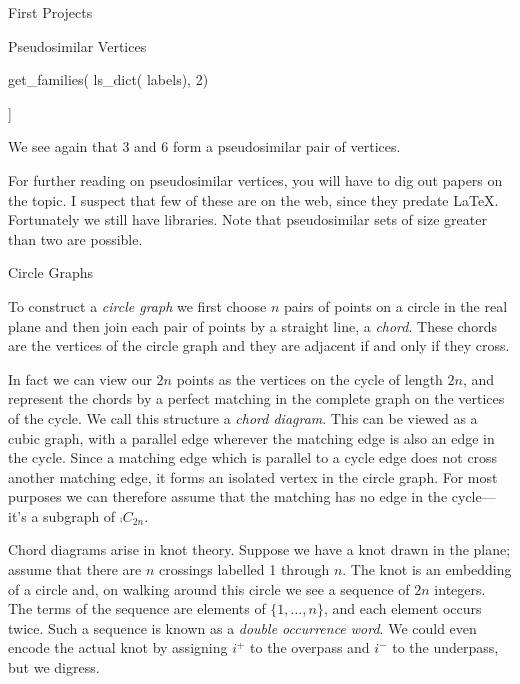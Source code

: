 \begin{chap}{First Projects}
\begin{sect}{Pseudosimilar Vertices}
\begin{sagecode}
\begin{sageinput}
get_families( ls_dict( labels), 2)
\end{sageinput}
\begin{sageoutput}
[[3, 6]]
\end{sageoutput}
\end{sagecode}
%
\begin{para}
We see again that 3 and 6 form a pseudosimilar pair of vertices.
\end{para}
%
\begin{para}
For further reading on pseudosimilar vertices, you will have to dig out papers
on the topic.  I suspect that few of these are on the web, since they
predate \LaTeX{}.  Fortunately we still have libraries.  Note that pseudosimilar
sets of size greater than two are possible.
\end{para}
%
\end{sect}
%
\begin{sect}{Circle Graphs}
%
\begin{para}
To construct a \textsl{circle graph} we first choose $n$ pairs of points on a 
circle in the real plane and then join each pair of points by a straight line,
a \textsl{chord}. These chords are the vertices of the circle graph and they
are adjacent if and only if they cross.
\end{para}
%
\begin{para}
In fact we can view our $2n$ points as the vertices on the cycle of length
$2n$, and represent the chords by a perfect matching in the complete graph
on the vertices of the cycle. We call this structure a \textsl{chord diagram}.
This can be viewed as a cubic graph, with a parallel edge wherever the matching
edge is also an edge in the cycle.
Since a matching edge which is parallel to a cycle edge does not cross
another matching edge, it forms an isolated vertex in the circle
graph. For most purposes we can therefore assume that the matching has
no edge in the cycle---it's a subgraph of $\comp{C_{2n}}$.
\end{para}
%
\begin{para}
Chord diagrams arise in knot theory. Suppose we have a knot drawn in the
plane; assume that there are $n$ crossings labelled 1 through $n$. The knot is 
an embedding of a circle and, on walking around this circle we see a sequence
of $2n$ integers. The terms of the sequence are elements of $\{1,\ldots,n\}$,
and each element occurs twice. Such a sequence is known as a 
\textsl{double occurrence word}. We could even encode the actual knot by
assigning $i^+$ to the overpass and $i^-$ to the underpass, but we digress.

\end{para}
\end{sect}
\end{chap}
